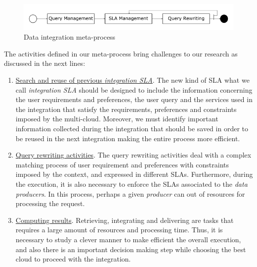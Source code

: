 \begin{figure}[h!]
\center
\includegraphics[scale=0.50]{meta-process.png}
\caption{Data integration meta-process}\label{fig:metaprocess}
\end{figure}

The activities defined in our meta-process bring challenges to our research as discussed in the next lines:
\begin{enumerate}
\item \underline{Search and reuse of previous \textsl{integration SLA}}. The new kind of SLA what we call \textsl{integration SLA} should be designed to include the information concerning the user requirements and preferences, the user query and the services used in the integration that satisfy the requirements, preferences and constraints imposed by the multi-cloud. Moreover, we must identify important information collected during the integration that should be saved in order to be reused in the next integration making the entire process more efficient. 
\item \underline{Query rewriting activities}. The query rewriting activities deal with a complex matching process of user requirement and preferences with constraints imposed by the context, and expressed in different SLAs. Furthermore, during the execution, it is also necessary to enforce the SLAs associated to the \textsl{data producers}. In this process, perhaps a given \textsl{producer} can out of resources for processing the request.
\item \underline{Computing results}. Retrieving, integrating and delivering are tasks that requires a large amount of resources and processing time. Thus, it is necessary to study a clever manner to make efficient the overall execution, and also there is an important decision making step while choosing the best cloud to proceed with the integration.
\end{enumerate}

